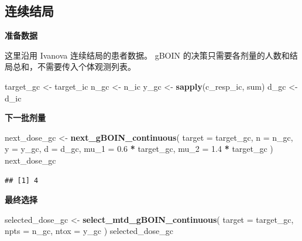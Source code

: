 \documentclass[
  chinese,
]{article}
\newenvironment{Shaded}{\begin{snugshade}}{\end{snugshade}}
\newcommand{\AttributeTok}[1]{\textcolor[rgb]{0.13,0.29,0.53}{#1}}
\newcommand{\FloatTok}[1]{\textcolor[rgb]{0.00,0.00,0.81}{#1}}
\newcommand{\FunctionTok}[1]{\textcolor[rgb]{0.13,0.29,0.53}{\textbf{#1}}}
\newcommand{\NormalTok}[1]{#1}
\newcommand{\OtherTok}[1]{\textcolor[rgb]{0.56,0.35,0.01}{#1}}
\newcommand{\SpecialCharTok}[1]{\textcolor[rgb]{0.81,0.36,0.00}{\textbf{#1}}}
\begin{document}
\subsection{连续结局}\label{ux8fdeux7eedux7ed3ux5c40-1}

\textbf{准备数据}

这里沿用 Ivanova 连续结局的患者数据。 gBOIN
的决策只需要各剂量的人数和结局总和，不需要传入个体观测列表。

\begin{Shaded}
\begin{Highlighting}[]
\NormalTok{target\_gc }\OtherTok{\textless{}{-}}\NormalTok{ target\_ic}
\NormalTok{n\_gc }\OtherTok{\textless{}{-}}\NormalTok{ n\_ic}
\NormalTok{y\_gc }\OtherTok{\textless{}{-}} \FunctionTok{sapply}\NormalTok{(c\_resp\_ic, sum)}
\NormalTok{d\_gc }\OtherTok{\textless{}{-}}\NormalTok{ d\_ic}
\end{Highlighting}
\end{Shaded}

\textbf{下一批剂量}

\begin{Shaded}
\begin{Highlighting}[]
\NormalTok{next\_dose\_gc }\OtherTok{\textless{}{-}} \FunctionTok{next\_gBOIN\_continuous}\NormalTok{(}
  \AttributeTok{target =}\NormalTok{ target\_gc, }\AttributeTok{n =}\NormalTok{ n\_gc, }\AttributeTok{y =}\NormalTok{ y\_gc, }\AttributeTok{d =}\NormalTok{ d\_gc,}
  \AttributeTok{mu\_1 =} \FloatTok{0.6} \SpecialCharTok{*}\NormalTok{ target\_gc, }\AttributeTok{mu\_2 =} \FloatTok{1.4} \SpecialCharTok{*}\NormalTok{ target\_gc}
\NormalTok{)}
\NormalTok{next\_dose\_gc}
\end{Highlighting}
\end{Shaded}

\begin{verbatim}
## [1] 4
\end{verbatim}

\textbf{最终选择}

\begin{Shaded}
\begin{Highlighting}[]
\NormalTok{selected\_dose\_gc }\OtherTok{\textless{}{-}} \FunctionTok{select\_mtd\_gBOIN\_continuous}\NormalTok{(}
  \AttributeTok{target =}\NormalTok{ target\_gc, }\AttributeTok{npts =}\NormalTok{ n\_gc, }\AttributeTok{ntox =}\NormalTok{ y\_gc}
\NormalTok{)}
\NormalTok{selected\_dose\_gc}
\end{Highlighting}
\end{Shaded}
\end{document}

